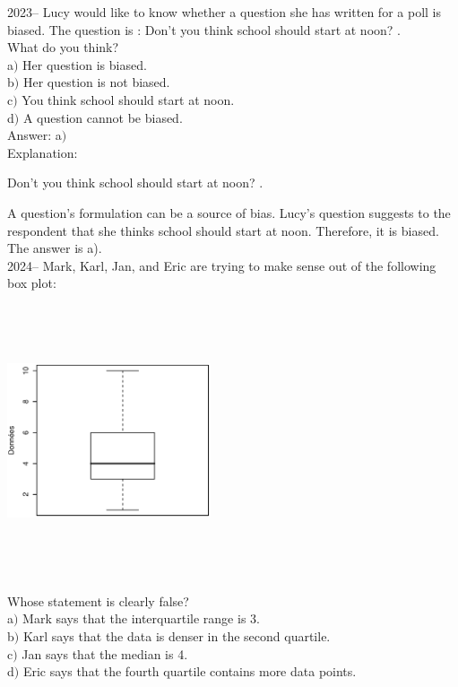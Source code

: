 \documentclass[letterpaper, 12pt]{article}
\begin{document}
2023-- Lucy would like to know whether a question she has written for a poll is biased. The question is : \og Don't you think school should start at noon? \fg.\\
What do you think? \\

a$)$ Her question is biased.\\
b$)$ Her question is not biased.\\
c$)$ You think school should start at noon.\\
d$)$ A question cannot be biased.\\

Answer: a$)$\\

Explanation:
\begin{center}
 \og Don't you think school should start at noon?  \fg.
\end{center}
A question's formulation can be a source of bias. Lucy's question suggests to the respondent that she thinks school should start at noon. Therefore, it is biased. \\
The answer is a).\\


2024-- Mark, Karl, Jan, and Eric are trying to make sense out of the following box plot:
\begin{center}
 \includegraphics[width=6cm,height=8cm,angle=-90]{Q2024.eps}
\end{center}

Whose statement is clearly false?\\

a$)$ Mark says that the interquartile range is 3.\\
b$)$ Karl says that the data is denser in the second quartile.\\
c$)$ Jan says that the median is 4.\\
d$)$ Eric says that the fourth quartile contains more data points. \\
\end{document}
